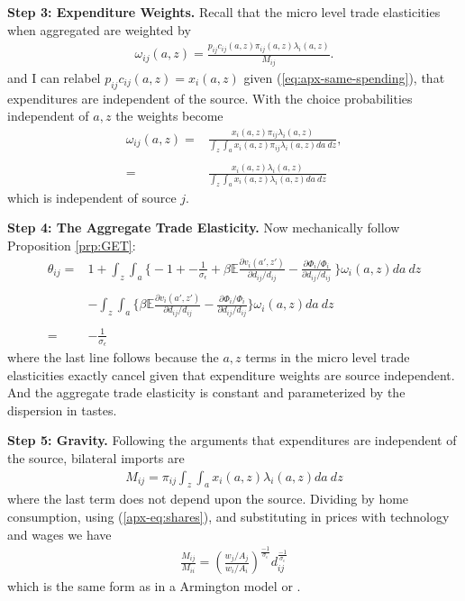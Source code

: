 \documentclass[12pt,pdftex]{article}
\begin{document}
\begin{onehalfspacing}
\textbf{Step 3: Expenditure Weights.} Recall that the micro level trade elasticities when aggregated are weighted by
\begin{align}
\omega_{ij}(a,z) = \frac{p_{ij}c_{ij}(a,z)\pi_{ij}(a,z) \lambda_{i}(a,z)}{M_{ij}}.
\end{align}
and I can relabel $p_{ij}c_{ij}(a,z) = x_{i}(a,z)$ given (\ref{eq:apx-same-spending}), that expenditures are independent of the source. With the choice probabilities independent of $a,z$ the weights become
\begin{align}
\omega_{ij}(a,z) =& \frac{x_{i}(a,z)\pi_{ij} \lambda_{i}(a,z)}{\int_{z}\int_{a}x_{i}(a,z)\pi_{ij} \lambda_{i}(a,z)da \ dz}, \\
\nonumber \\
=& \frac{x_{i}(a,z) \lambda_{i}(a,z)}{\int_{z}\int_{a} x_{i}(a,z) \lambda_{i}(a,z)da \ dz}
\end{align}
which is independent of source $j$.

\textbf{Step 4: The Aggregate Trade Elasticity.} Now mechanically follow Proposition \ref{prp:GET}:
\begin{align}
\nonumber
\theta_{ij} =& 1 + \int_{z}\int_{a} \bigg \{ -1 +  -\frac{1}{\sigma_{\epsilon}} + \beta \mathbb{E} \frac{\partial v_{i}(a',z')}{\partial d_{ij}/d_{ij}} -  \frac{\partial \Phi_{i} / \Phi_{i}}{\partial d_{ij}/d_{ij}} \  \bigg \}\omega_{i}(a,z)da \ dz \\
\nonumber \\
& - \int_{z}\int_{a} \bigg \{   \beta \mathbb{E} \frac{\partial v_{i}(a',z')}{\partial d_{ij}/d_{ij}} -  \frac{\partial \Phi_{i} / \Phi_{i}}{\partial d_{ij}/d_{ij}}  \bigg \}\omega_{i}(a,z)da \ dz \\
\nonumber \\
= & -\frac{1}{\sigma_{\epsilon}} \nonumber
\end{align}
where the last line follows because the $a,z$ terms in the micro level trade elasticities exactly cancel given that expenditure weights are source independent. And the aggregate trade elasticity is constant and parameterized by the dispersion in tastes.

\textbf{Step 5: Gravity.} Following the arguments that expenditures are independent of the source, bilateral imports are
\begin{align}
M_{ij} = \pi_{ij} \int_{z}\int_{a} x_{i}(a,z) \lambda_{i}(a,z)da \ dz
\end{align}
where the last term does not depend upon the source. Dividing by home consumption, using (\ref{apx-eq:shares}), and substituting in prices with technology and wages we have
\begin{align}
\frac{M_{ij}}{M_{ii}} = \left( \frac{  w_{j} / A_{j} }{  w_{i} / A_{i} } \right)^{\frac{-1}{\sigma_{\epsilon}}} d_{ij}^{\frac{-1}{\sigma_{\epsilon}}}
\end{align}
which is the same form as in a Armington model or \citet{eaton2002technology}.


\end{onehalfspacing}
\end{document}
